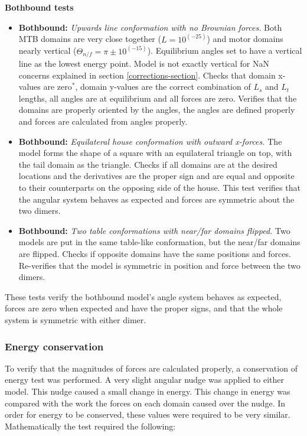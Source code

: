 \documentclass[10pt]{article} %
\begin{document}
\textbf{Bothbound tests}
\begin{itemize}
\item \textbf{Bothbound:} \textit{Upwards line conformation with no Brownian forces.} Both MTB domains are very close together ($L=10^(-25)$) and motor domains nearly vertical ($\Theta_{n/f} = \pi \pm 10^(-15)$). Equilibrium angles set to have a vertical line as the lowest energy point. Model is not exactly vertical for NaN concerns explained in section \ref{corrections-section}. Checks that domain x-values are zero$^*$, domain y-values are the correct combination of $L_s$ and $L_t$ lengths, all angles are at equilibrium and all forces are zero. Verifies that the domains are properly oriented by the angles, the angles are defined properly and forces are calculated from angles properly.
\item \textbf{Bothbound:} \textit{Equilateral house conformation with outward x-forces.} The model forms the shape of a square with an equilateral triangle on top, with the tail domain as the triangle. Checks if all domains are at the desired locations and the derivatives are the proper sign and are equal and opposite to their counterparts on the opposing side of the house. This test verifies that the angular system behaves as expected and forces are symmetric about the two dimers.
\item \textbf{Bothbound:} \textit{Two table conformations with near/far domains flipped.} Two models are put in the same table-like conformation, but the near/far domains are flipped. Checks if opposite domains have the same positions and forces. Re-verifies that the model is symmetric in position and force between the two dimers.
\end{itemize}

These tests verify the bothbound model's angle system behaves as expected, forces are zero when expected and have the proper signs, and that the whole system is symmetric with either dimer.

\subsubsection{Energy conservation}
To verify that the magnitudes of forces are calculated properly, a conservation of energy test was performed. A very slight angular nudge was applied to either model. This nudge caused a small change in energy. This change in energy was compared with the work the forces on each domain caused over the nudge. In order for energy to be conserved, these values were required to be very similar. Mathematically the test required the following:
\end{document}
